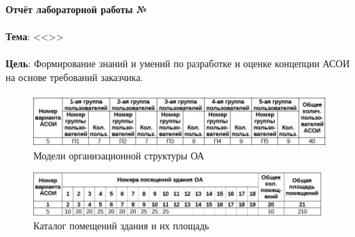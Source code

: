 \documentclass[12pt, a4paper, simple]{eskdtext}
\def \gpiDocTopic {Отчёт лабораторной работы №\gpiDocNum}
\begin{document}
    
    \thispagestyle{plain}
    \pagestyle{plain}

    \begin{center}
        \textbf{\gpiDocTopic}
    \end{center}

    \paragraph{} \textbf{Тема}: <<\gpiTopicRep>>

    \paragraph{} \textbf{Цель}:
    Формирование знаний и умений по разработке и оценке концепции АСОИ на основе требований заказчика.



    \paragraph{} \hspace{0pt}

    \begin{figure}[h!]
        \centering
        \includegraphics[width=16cm]
            {_docs/ТаблицаВ1МоделиОрганизационнойСтруктурыОА.jpg}
        \caption{Модели организационной структуры ОА}
    \end{figure}

    \begin{figure}[h!]
        \centering
        \includegraphics[width=16cm]
            {_docs/ТаблицаВ2КаталогПомещенийЗданияИИхПлощадь.jpg}
        \caption{Каталог помещений здания и их площадь}
    \end{figure}
\end{document}
